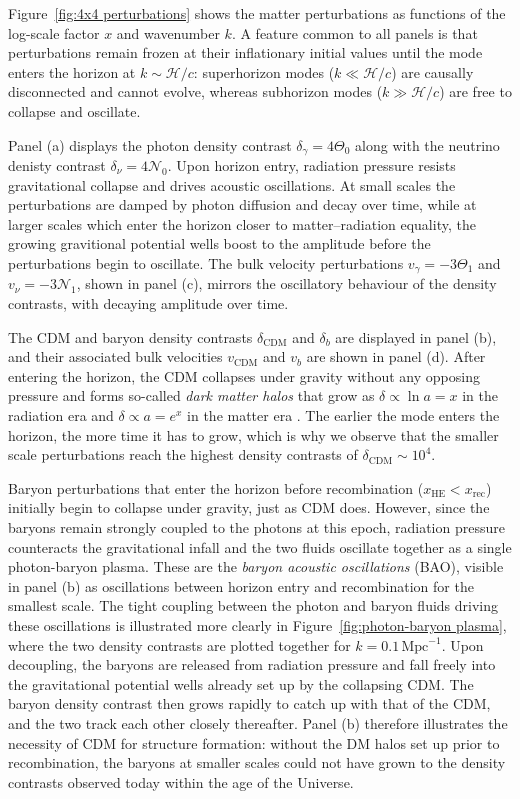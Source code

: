 \documentclass[twocolumn]{aa}
\begin{document}
Figure~\ref{fig:4x4 perturbations} shows the matter perturbations as functions of the log-scale factor $x$ and wavenumber $k$. A feature common to all panels is that perturbations remain frozen at their inflationary initial values until the mode enters the horizon at $k \sim \mathcal{H}/c$: superhorizon modes ($k \ll \mathcal{H}/c$) are causally disconnected and cannot evolve, whereas subhorizon modes ($k \gg \mathcal{H}/c$) are free to collapse and oscillate.

Panel (a) displays the photon density contrast $\delta_\gamma = 4\Theta_0$ along with the neutrino denisty contrast $\delta_\nu = 4\mathcal{N}_0$. Upon horizon entry, radiation pressure resists gravitational collapse and drives acoustic oscillations. At small scales the perturbations are damped by photon diffusion and decay over time, while at larger scales which enter the horizon closer to matter--radiation equality, the growing gravitional potential wells boost to the amplitude before the perturbations begin to oscillate. The bulk velocity perturbations $v_\gamma = -3\Theta_1$ and $v_\nu = -3\mathcal{N}_1$, shown in panel (c), mirrors the oscillatory behaviour of the density contrasts, with decaying amplitude over time.

The CDM and baryon density contrasts $\delta_\text{CDM}$ and $\delta_b$ are displayed in panel (b), and their associated bulk velocities $v_\text{CDM}$ and $v_b$ are shown in panel (d). After entering the horizon, the CDM collapses under gravity without any opposing pressure and forms so-called \textit{dark matter halos} that grow as $\delta \propto \ln a = x$ in the radiation era and $\delta \propto a = e^x$ in the matter era \citep{Meszaros}.  The earlier the mode enters the horizon, the more time it has to grow, which is why we observe that the smaller scale perturbations reach the highest density contrasts of $\delta_{\text{CDM}} \sim 10^4$.

Baryon perturbations that enter the horizon before recombination ($x_\text{HE} < x_\text{rec}$) initially begin to collapse under gravity, just as CDM does. However, since the baryons remain strongly coupled to the photons at this epoch, radiation pressure counteracts the gravitational infall and the two fluids oscillate together as a single photon-baryon plasma. These are the \textit{baryon acoustic oscillations} (BAO), visible in panel (b) as oscillations between horizon entry and recombination for the smallest scale. The tight coupling between the photon and baryon fluids driving these oscillations is illustrated more clearly in Figure~\ref{fig:photon-baryon plasma}, where the two density contrasts are plotted together for $k = 0.1\,\text{Mpc}^{-1}$. Upon decoupling, the baryons are released from radiation pressure and fall freely into the gravitational potential wells already set up by the collapsing CDM. The baryon density contrast then grows rapidly to catch up with that of the CDM, and the two track each other closely thereafter. Panel (b) therefore illustrates the necessity of CDM for structure formation: without the DM halos set up prior to recombination, the baryons at smaller scales could not have grown to the density contrasts observed today within the age of the Universe.\\
\end{document}
